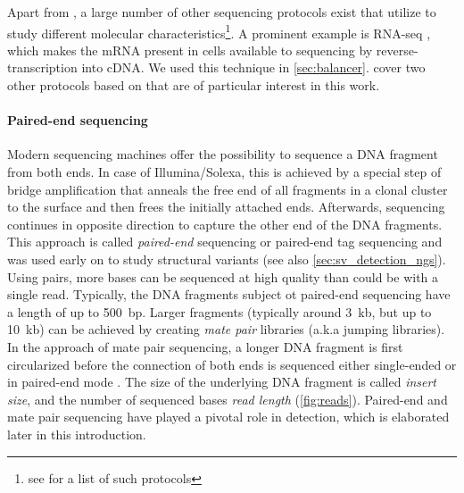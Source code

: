Apart from \wgs, a large number of
other sequencing protocols exist that utilize \mps to study different molecular
characteristics\footnote{see \citet{Pachter2018} for a list of such protocols}.
A prominent example is RNA-seq \citep{Morin2008,Wang2009},
which makes the mRNA present in cells available to sequencing by
reverse-transcription into cDNA. We used this technique in \cref{sec:balancer}.
 cover two other protocols based on \mps that are
of particular interest in this work.

\paragraph{Paired-end sequencing}


Modern sequencing machines offer the possibility to sequence a DNA fragment
from both ends. In case of Illumina/Solexa, this is achieved by a special step
of bridge amplification that anneals the free end of all fragments in a clonal
cluster to the surface and then frees the initially attached ends. Afterwards,
sequencing continues in opposite direction to capture the other end of the
DNA fragments. This approach is called \emph{paired-end} sequencing or
paired-end tag sequencing and was used early on to study structural variants
\citep{Campbell2008} (see also \cref{sec:sv_detection_ngs}). Using pairs, more
bases can be sequenced at high quality than could be with a single read.
Typically, the DNA fragments subject ot paired-end sequencing have a length of
up to 500~bp. Larger fragments (typically around 3~kb, but up to 10~kb) can be
achieved by creating \emph{mate pair} libraries (a.k.a jumping libraries). In the
approach of mate pair sequencing, a longer DNA fragment is first circularized before
the connection of both ends is sequenced either single-ended or in paired-end mode
\citep{Korbel2007}. The size of the underlying DNA fragment is called
\emph{insert size}, and the number of sequenced bases \emph{read length}
(\cref{fig:reads}). Paired-end and mate pair sequencing have played a pivotal
role in \sv detection, which is elaborated later in this introduction.

